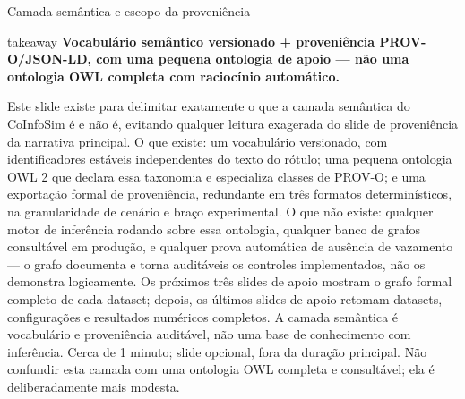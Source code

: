 \begin{frame}{Camada semântica e escopo da proveniência}
  \vspace{.06cm}
  \begin{beamercolorbox}[wd=\linewidth,sep=.08cm,rounded=true]{takeaway}
    \centering\sffamily\bfseries\fontsize{9.4}{11.1}\selectfont
    Vocabulário semântico versionado + proveniência PROV-O/JSON-LD, com uma pequena ontologia de apoio --- não uma ontologia OWL completa com raciocínio automático.
  \end{beamercolorbox}

  \speakernotes
    {Este slide existe para delimitar exatamente o que a camada semântica do CoInfoSim é e não é, evitando qualquer leitura exagerada do slide de proveniência da narrativa principal. O que existe: um vocabulário versionado, com identificadores estáveis independentes do texto do rótulo; uma pequena ontologia OWL 2 que declara essa taxonomia e especializa classes de PROV-O; e uma exportação formal de proveniência, redundante em três formatos determinísticos, na granularidade de cenário e braço experimental. O que não existe: qualquer motor de inferência rodando sobre essa ontologia, qualquer banco de grafos consultável em produção, e qualquer prova automática de ausência de vazamento --- o grafo documenta e torna auditáveis os controles implementados, não os demonstra logicamente.}
    {Os próximos três slides de apoio mostram o grafo formal completo de cada dataset; depois, os últimos slides de apoio retomam datasets, configurações e resultados numéricos completos.}
    {A camada semântica é vocabulário e proveniência auditável, não uma base de conhecimento com inferência.}
    {Cerca de 1 minuto; slide opcional, fora da duração principal.}
    {Não confundir esta camada com uma ontologia OWL completa e consultável; ela é deliberadamente mais modesta.}
\end{frame}

